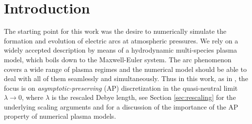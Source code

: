 \documentclass{article}
\newcommand{\mycomment}[1]{\noindent\textcolor{orange}{\underline{\textsf{\textbf{#1}}}}}
\begin{document}



\section{Introduction}

The starting point for this work was the desire to numerically simulate the formation and evolution of electric arcs at atmospheric pressures. We rely on a widely accepted description by means of a hydrodynamic multi-species plasma model, which boils down to the Maxwell-Euler system. The arc phenomenon covers a wide range of plasma regimes and the numerical model should be able to deal with all of them seamlessly and simultaneously. Thus in this work, as in \cite{degond_2012}, the focus is on \emph{asymptotic-preserving} (AP) discretization in the quasi-neutral limit $\lambda \rightarrow 0$, where $\lambda$ is the rescaled Debye length, see Section \ref{sec:rescaling} for the underlying scaling arguments and \cite{degond_2012,degond_2017} for a discussion of the importance of the AP property of numerical plasma models.  
\end{document}

